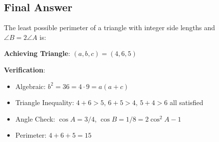 \documentclass[12pt]{article}
\begin{document}
\subsection*{Final Answer}

The least possible perimeter of a triangle with integer side lengths and $\angle B = 2\angle A$ is:

\begin{center}
\end{center}

\textbf{Achieving Triangle}: $(a, b, c) = (4, 6, 5)$

\textbf{Verification}:
\begin{itemize}
    \item Algebraic: $b^2 = 36 = 4 \cdot 9 = a(a+c)$ \checkmark
    \item Triangle Inequality: $4+6>5$, $6+5>4$, $5+4>6$ all satisfied \checkmark
    \item Angle Check: $\cos A = 3/4$, $\cos B = 1/8 = 2\cos^2 A - 1$ \checkmark
    \item Perimeter: $4 + 6 + 5 = 15$ \checkmark
\end{itemize}
\end{document}

